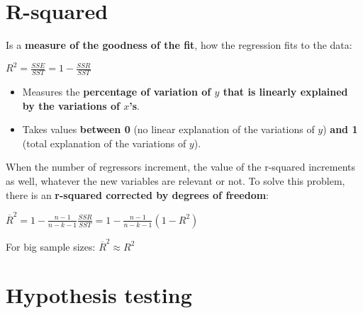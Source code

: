 \documentclass[10pt, a4paper, landscape]{extarticle}
\begin{document}
\begin{multicols}{3}
\section*{R-squared}
	Is a \textbf{measure of the goodness of the fit}, how the regression fits to the data:
	\begin{center}
		$R^2 = \frac{SSE}{SST} = 1 - \frac{SSR}{SST}$
	\end{center}
	\begin{itemize}[leftmargin=*]
		\item Measures the \textbf{percentage of variation of $y$ that is linearly explained by the variations of $x$'s}.
		\item Takes values \textbf{between 0} (no linear explanation of the variations of $y$) \textbf{and 1} (total explanation of the variations of $y$).
	\end{itemize}
	When the number of regressors increment, the value of the r-squared increments as well, whatever the new variables are relevant or not. To solve this problem, there is an \textbf{r-squared corrected by degrees of freedom}:
	\begin{center}
		$\overline{R}^2 = 1 - \frac{n-1}{n-k-1} \frac{SSR}{SST} = 1 - \frac{n-1}{n-k-1} (1-R^2)$
	\end{center}
	For big sample sizes: $\overline{R}^2 \approx R^2$

\section*{Hypothesis testing}

\end{multicols}
\end{document}
